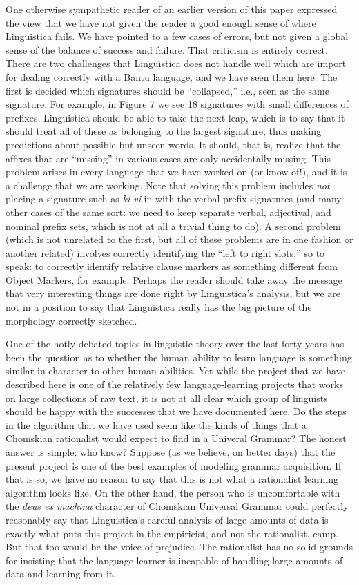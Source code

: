 \documentclass[output=paper,colorlinks,citecolor=brown]{langscibook}
\begin{document}
One otherwise sympathetic reader of an earlier version of this paper expressed the view that we have not given the reader a good enough sense of where Linguistica fails. We have pointed to a few cases of errors, but not given a global sense of the balance of success and failure.  That criticism is entirely correct. There are two challenges that Linguistica does not handle well which are import for dealing correctly with a Bantu language, and we have seen them here. The first is decided which signatures should be ``collapsed,'' i.e., seen as the same signature. For example, in Figure 7 we see 18 signatures with small differences of prefixes. Linguistica should be able to take the next leap, which is to say that it should treat all of these as belonging to the largest signature, thus making predictions about possible but unseen words. It should, that is, realize that the affixes that are ``missing'' in various cases are only accidentally missing. This problem arises in every language that we have worked on (or know of!), and it is a challenge that we are working. Note that solving this problem includes {\em not} placing a signature such as {\em ki-vi} in with the verbal prefix signatures (and many other cases of the same sort: we need to keep separate verbal, adjectival, and nominal prefix sets, which is not at all a trivial thing to do). A second problem (which is not unrelated to the first, but all of these problems are in one fashion or another related) involves correctly identifying the ``left to right slots,'' so to speak: to correctly identify relative clause markers as something different from Object Markers, for example. Perhaps the reader should take away the message that very interesting things are done right by Linguistica's analysis, but we are not in a position to say that Linguistica really has the big picture of the morphology correctly sketched. 

One of the hotly debated topics in linguistic theory over the last forty years has been the question as to whether the human ability to learn language is something similar in character to other human abilities. Yet while the project that we have described here is one of the relatively few language-learning projects that works on large collections of raw text, it is not at all clear which group of linguists should be happy with the successes that we have documented here. Do the steps in the algorithm that we have used seem like the kinds of things that a Chomskian rationalist would expect to find in a Univeral Grammar? The honest answer is simple: who know? Suppose (as we believe, on better days) that the present project is one of the best examples of modeling grammar acquisition. If that is so, we have no reason to say that this is not what a rationalist learning algorithm looks like. On the other hand, the person who is uncomfortable with the \textit{deus ex machina} character of Chomskian Universal Grammar could perfectly reasonably say that Linguistica's careful analysis of large amounts of data is exactly what puts this project in the empiricist, and not the rationalist, camp. But that too would be the voice of prejudice. The rationalist has no solid grounds for insisting that the language learner is incapable of handling large amounts of data and learning from it. 
\end{document}
